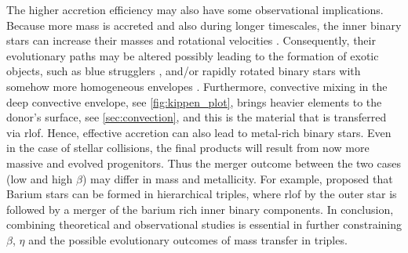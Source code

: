 The higher accretion efficiency may also have some observational implications. Because more mass is accreted and also during longer timescales, the inner binary stars can increase their masses and rotational velocities \cite{packet1981rotation}. Consequently, their evolutionary paths may be altered possibly leading to the formation of exotic objects, such as blue strugglers \cite{zwart2019triple}, and/or rapidly rotated binary stars with somehow more homogeneous envelopes \cite{dorozsmai2023stellar}. Furthermore, convective mixing in the deep convective envelope, see \cref{fig:kippen_plot}, brings heavier elements to the donor's surface, see \cref{sec:convection}, and this is the material that is transferred via \ac{rlof}. Hence, effective accretion can also lead to metal-rich binary stars. Even in the case of stellar collisions, the final products will result from now more massive and evolved progenitors. Thus the merger outcome between the two cases (low and high $\beta$) may differ in mass and metallicity. For example, \cite{gao2023stellar} proposed that Barium stars can be formed in hierarchical triples, where \ac{rlof} by the outer star is followed by a merger of the barium rich inner binary components. In conclusion, combining theoretical and observational studies is essential in further constraining $\beta$, $\eta$ and the possible evolutionary outcomes of mass transfer in triples.



